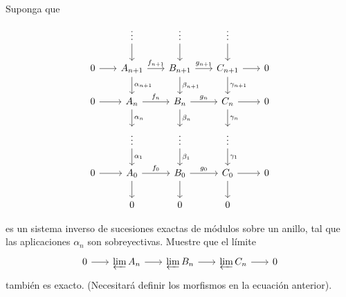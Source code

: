 \setcounter{neje}{12}
\begin{nejer}
Suponga que
\[\begin{tikzcd}[sep=1.8em]
  & \vdots & \vdots & \vdots \\
  0 & A_{n+1} & B_{n+1} & C_{n+1} & 0 \\
  0 & A_n & B_n & C_n & 0 \\
  & \vdots & \vdots & \vdots \\
  0 & A_0 & B_0 & C_0 & 0 \\
  & 0 & 0 & 0
  \arrow[from=2-1, to=2-2]
  \arrow["f_{n+1}", from=2-2, to=2-3]
  \arrow["g_{n+1}", from=2-3, to=2-4]
  \arrow[from=2-4, to=2-5]
  \arrow[from=3-1, to=3-2]
  \arrow["f_{n}", from=3-2, to=3-3]
  \arrow["g_{n}", from=3-3, to=3-4]
  \arrow[from=3-4, to=3-5]
  \arrow[from=5-1, to=5-2]
  \arrow["f_{0}", from=5-2, to=5-3]
  \arrow["g_{0}", from=5-3, to=5-4]
  \arrow[from=5-4, to=5-5]
  \arrow[from=1-2, to=2-2]
  \arrow[from=1-3, to=2-3]
  \arrow[from=1-4, to=2-4]
  \arrow["\alpha_{n+1}", from=2-2, to=3-2]
  \arrow["\beta_{n+1}", from=2-3, to=3-3]
  \arrow["\gamma_{n+1}", from=2-4, to=3-4]
  \arrow["\alpha_{n}", from=3-2, to=4-2]
  \arrow["\beta_{n}", from=3-3, to=4-3]
  \arrow["\gamma_{n}", from=3-4, to=4-4]
  \arrow["\alpha_{1}", from=4-2, to=5-2]
  \arrow["\beta_{1}", from=4-3, to=5-3]
  \arrow["\gamma_{1}", from=4-4, to=5-4]
  \arrow[from=5-2, to=6-2]
  \arrow[from=5-3, to=6-3]
  \arrow[from=5-4, to=6-4]
\end{tikzcd}\]

es un sistema inverso de sucesiones exactas de módulos sobre un anillo, tal que las aplicaciones $\alpha_n$ son sobreyectivas. Muestre que el límite
\[\begin{tikzcd}[sep=1.8em]
0 & \varprojlim A_n & \varprojlim B_n & \varprojlim C_n & 0
\arrow[from=1-1, to=1-2]
\arrow[from=1-2, to=1-3]
\arrow[from=1-3, to=1-4]
\arrow[from=1-4, to=1-5]
\end{tikzcd}\]
también es exacto. (Necesitará definir los morfismos en la ecuación anterior).
\end{nejer}
